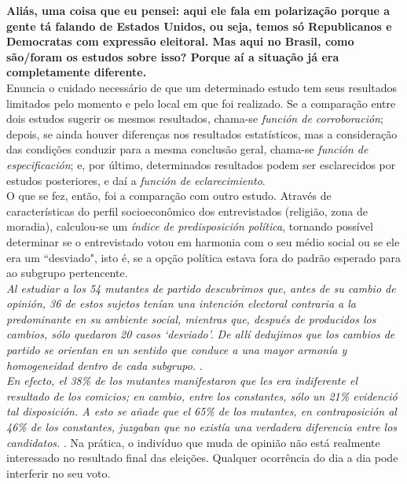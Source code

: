 \noindent \textbf{Aliás, uma coisa que eu pensei: aqui ele fala em polarização porque a gente tá falando de Estados Unidos, ou seja, temos só Republicanos e Democratas com expressão eleitoral. Mas aqui no Brasil, como são/foram os estudos sobre isso? Porque aí a situação já era completamente diferente.} \\

\noindent Enuncia o cuidado necessário de que um determinado estudo tem seus resultados limitados pelo momento e pelo local em que foi realizado. Se a comparação entre dois estudos sugerir os mesmos resultados, chama-se \textit{función de corroboración}; depois, se ainda houver diferenças nos resultados estatísticos, mas a consideração das condições conduzir para a mesma conclusão geral, chama-se \textit{función de especificación}; e, por último, determinados resultados podem ser esclarecidos por estudos posteriores, e daí a \textit{función de eclarecimiento}. \\

\noindent O que se fez, então, foi a comparação com outro estudo. Através de características do perfil socioeconômico dos entrevistados (religião, zona de moradia), calculou-se um \textit{índice de predisposición política}, tornando possível determinar se o entrevistado votou em harmonia com o seu médio social ou se ele era um ``desviado", isto é, se a opção política estava fora do padrão esperado para ao subgrupo pertencente. \\

\noindent \textit{Al estudiar a los 54 mutantes de partido descubrimos que, antes de su cambio de opinión, 36 de estos sujetos tenían una intención electoral contraria a la predominante en su ambiente social, mientras que, después de producidos los cambios, sólo quedaron 20 casos `desviado'. De allí dedujimos que los cambios de partido se orientan en un sentido que conduce a una mayor armonía y homogeneidad dentro de cada subgrupo.} \cite[~p. 6]{lazarsfeld_berelson_gaudet}. \\

\noindent \textit{En efecto, el 38\% de los mutantes manifestaron que les era indiferente el resultado de los comicios; en cambio, entre los constantes, sólo un 21\% evidenció tal disposición. A esto se añade que el 65\% de los mutantes, en contraposición al 46\% de los constantes, juzgaban que no existía una verdadera diferencia entre los candidatos.} \cite[~p. 7]{lazarsfeld_berelson_gaudet}. Na prática, o indivíduo que muda de opinião não está realmente interessado no resultado final das eleições. Qualquer ocorrência do dia a dia pode interferir no seu voto. \\

